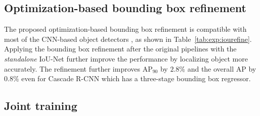 \documentclass[runningheads]{llncs}
\begin{document}
\subsection{Optimization-based bounding box refinement}
\label{sec:expr:refine}

\begin{table}[!t]
\centering
{}
\caption{The optimization-based bounding box refinement further improves the performance of several CNN-based object detectors.}
\label{tab:exp:iourefine}
\end{table}


The proposed optimization-based bounding box refinement is compatible with most of the CNN-based object detectors \cite{Lin_2017_CVPR,cai2017cascade,he2017mask}, as shown in Table~\ref{tab:exp:iourefine}. Applying the bounding box refinement after the original pipelines with the \emph{standalone} IoU-Net further improve the performance by localizing object more accurately. The refinement further improves $\text{AP}_\text{90}$ by $2.8\%$ and the overall AP by $0.8\%$ even for Cascade R-CNN which has a three-stage bounding box regressor.

\subsection{Joint training}
\end{document}
